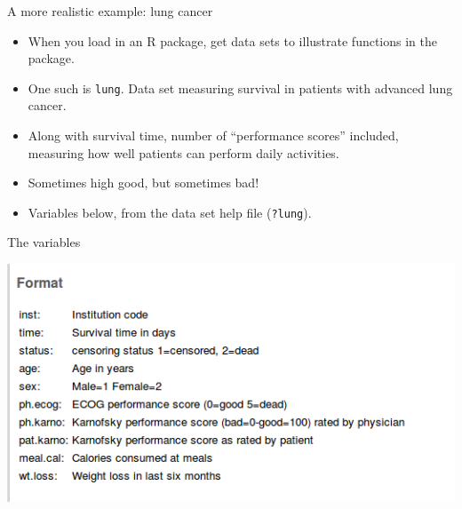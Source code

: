 \documentclass[ignorenonframetext,]{beamer}
\begin{document}
\begin{frame}[fragile]{A more realistic example: lung cancer}
\protect\hypertarget{a-more-realistic-example-lung-cancer}{}

\begin{itemize}
\item
  When you load in an R package, get data sets to illustrate functions
  in the package.
\item
  One such is \texttt{lung}. Data set measuring survival in patients
  with advanced lung cancer.
\item
  Along with survival time, number of ``performance scores'' included,
  measuring how well patients can perform daily activities.
\item
  Sometimes high good, but sometimes bad!
\item
  Variables below, from the data set help file (\texttt{?lung}).
\end{itemize}

\end{frame}

\begin{frame}{The variables}
\protect\hypertarget{the-variables}{}

\includegraphics{lung-cancer-data.png}

\end{frame}
\end{document}
